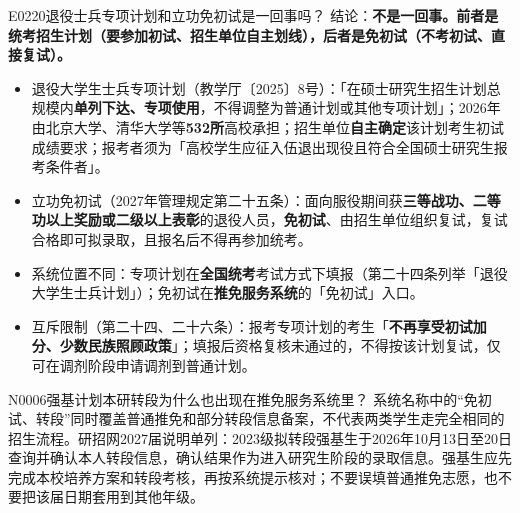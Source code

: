 \begin{qa}{E0220}{退役士兵专项计划和立功免初试是一回事吗？}
结论：\textbf{不是一回事。前者是统考招生计划（要参加初试、招生单位自主划线），后者是免初试（不考初试、直接复试）。}
\begin{itemize}
  \item 退役大学生士兵专项计划（教学厅〔2025〕8号）：「在硕士研究生招生计划总规模内\textbf{单列下达、专项使用}，不得调整为普通计划或其他专项计划」；2026年由北京大学、清华大学等\textbf{532所}高校承担；招生单位\textbf{自主确定}该计划考生初试成绩要求；报考者须为「高校学生应征入伍退出现役且符合全国硕士研究生报考条件者」。
  \item 立功免初试（2027年管理规定第二十五条）：面向服役期间获\textbf{三等战功、二等功以上奖励或二级以上表彰}的退役人员，\textbf{免初试}、由招生单位组织复试，复试合格即可拟录取，且报名后不得再参加统考。
  \item 系统位置不同：专项计划在\textbf{全国统考}考试方式下填报（第二十四条列举「退役大学生士兵计划」）；免初试在\textbf{推免服务系统}的「免初试」入口。
  \item 互斥限制（第二十四、二十六条）：报考专项计划的考生「\textbf{不再享受初试加分、少数民族照顾政策}」；填报后资格复核未通过的，不得按该计划复试，仅可在调剂阶段申请调剂到普通计划。
\end{itemize}
\end{qa}


\begin{qa}{N0006}{强基计划本研转段为什么也出现在推免服务系统里？}
系统名称中的“免初试、转段”同时覆盖普通推免和部分转段信息备案，不代表两类学生走完全相同的招生流程。研招网2027届说明单列：2023级拟转段强基生于2026年10月13日至20日查询并确认本人转段信息，确认结果作为进入研究生阶段的录取信息。强基生应先完成本校培养方案和转段考核，再按系统提示核对；不要误填普通推免志愿，也不要把该届日期套用到其他年级。
\end{qa}

